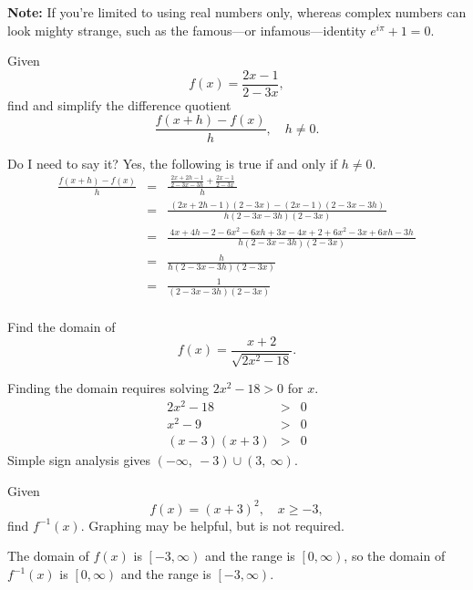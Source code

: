 \documentclass[12pt,addpoints, answers, fleqn]{exam}
\begin{document}
\begin{questions}
\begin{solution}
\textbf{Note:} If you're limited to using real numbers only, whereas complex numbers can look mighty strange, such as the famous---or infamous---identity $e^{i\pi} + 1 =0$.
\end{solution}

\question Given
\[
f\left( x \right) = \frac{2x-1}{2-3x},
\]
find and simplify the difference quotient
\[
\frac{f\left( x + h\right) - f\left( x \right)}{h}, \quad h \neq 0.
\]
\begin{solution}
Do I need to say it? Yes, the following is true if and only if $h \neq 0$.
\begin{eqnarray*}
\frac{f\left( x + h\right) - f\left( x \right)}{h} &=& \frac{\ \displaystyle \frac{2x + 2h -1}{2 - 3x - 3h} + \frac{2x-1}{2-3x} \ }{h}\\
&=& \frac{\ \left(2x + 2h -1\right)\left(2-3x\right) - \left(2x-1\right)\left(2 - 3x - 3h\right) \ }{h\left(2 - 3x - 3h\right)\left(2-3x\right)}\\
&=& \frac{\ 4x + 4h -2  -6x^2 -6xh +3x  -4x+2 + 6x^2-3x   +6xh-3h \ }{h\left(2 - 3x - 3h\right)\left(2-3x\right)}\\
&=& \frac{\  h \ }{h\left(2 - 3x - 3h\right)\left(2-3x\right)}\\
&=& \boxed{\frac{\  1 \ }{\left(2 - 3x - 3h\right)\left(2-3x\right)}}\\
\end{eqnarray*}
\end{solution}
\question Find the domain of
\[
f\left(x \right) = \frac{x + 2}{\sqrt{2x^2 - 18}}.
\]
\begin{solution}
Finding the domain requires solving $2x^2 - 18 > 0$ for $x$.
\begin{eqnarray*}
2x^2 - 18 &>& 0\\
x^2 - 9 &>& 0\\
\left( x - 3 \right) \left( x + 3 \right) &>& 0
\end{eqnarray*}
Simple sign analysis gives $\boxed{\left( -\infty, \ -3 \right) \cup \left( 3, \ \infty \right)}$.
\end{solution}
\question Given
\[
f \left( x \right) = \left( x + 3 \right)^2, \quad x \geq -3,
\]
find $f^{-1} \left( x \right)$. Graphing may be helpful, but is not required.
\begin{solution}
The domain of $f \left( x \right)$ is $\left[-3, \infty \right)$ and the range is $\left[0, \infty \right)$, so the domain of $f^{-1} \left( x \right)$ is $\left[0, \infty \right)$ and the range is  $\left[-3, \infty \right)$.

\end{solution}
\end{questions}
\end{document}
